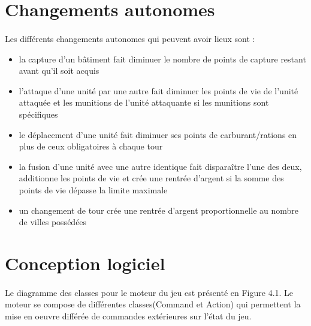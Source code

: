 \documentclass[12pt]{report}
\begin{document}
\section{Changements autonomes}
\paragraph{}Les différents changements autonomes qui peuvent avoir lieux sont :
\begin{itemize}
    \item la capture d'un bâtiment fait diminuer le nombre de points de capture restant avant qu'il soit acquis
    \item l'attaque d'une unité par une autre fait diminuer les points de vie de l'unité attaquée et les munitions de l'unité attaquante si les munitions sont spécifiques
    \item le déplacement d'une unité fait diminuer ses points de carburant/rations en plus de ceux obligatoires à chaque tour
    \item la fusion d'une unité avec une autre identique fait disparaître l'une des deux, additionne les points de vie et crée une rentrée d'argent si la somme des points de vie dépasse la limite maximale
    \item un changement de tour crée une rentrée d'argent proportionnelle au nombre de villes possédées
\end{itemize}

\section{Conception logiciel}
\paragraph{}Le diagramme des classes pour le moteur du jeu est présenté en Figure  4.1. Le moteur se compose de différentes classes(Command et Action) qui permettent la mise en oeuvre différée de commandes extérieures sur l'état du jeu.
\end{document}
